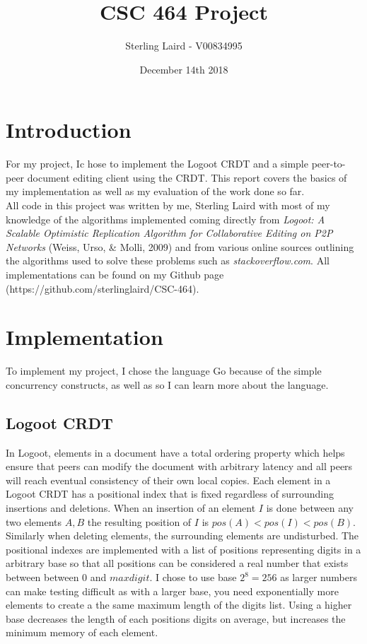 \documentclass[11pt]{article}
\title{CSC 464 Project}
\author{Sterling Laird - V00834995}
\date{December 14th 2018}
\begin{document}
\maketitle

\section{Introduction}
For my project, Ic hose  to implement the Logoot CRDT and a simple peer-to-peer document editing client using the CRDT. This report covers the basics of my implementation as well as my evaluation of the work done so far.\\

All code in this project was written by me, Sterling Laird with most of my knowledge of the algorithms implemented coming directly from \textit{Logoot: A Scalable Optimistic Replication Algorithm for Collaborative Editing on P2P Networks} (Weiss, Urso, \& Molli, 2009) and from various online sources outlining the algorithms used to solve these problems such as \textit{stackoverflow.com}. All implementations can be found on my Github page \\(https://github.com/sterlinglaird/CSC-464).

\pagebreak

\section{Implementation}
To implement my project, I chose  the language Go because of the simple concurrency constructs, as well as so I can learn more about the language.

\subsection{Logoot CRDT}
In Logoot, elements in a document have a total ordering property which helps ensure that peers can modify the document with arbitrary latency and all peers will reach eventual consistency of their own local copies. Each element in a Logoot CRDT has a positional index that is fixed regardless of surrounding insertions and deletions. When an insertion of an element $I$ is done between any two elements $A,B$ the resulting position of $I$ is $pos(A) < pos(I) < pos(B)$. Similarly when deleting elements, the surrounding elements are undisturbed. The positional indexes are implemented with a list of positions representing digits in a arbitrary base so that all positions can be considered a real number that exists between between $0$ and $maxdigit$. I chose to use base $2^8=256$ as larger numbers can make testing difficult as with a larger base, you need exponentially more elements to create a the same maximum length of the digits list. Using a higher base decreases the length of each positions digits on average, but increases the minimum memory of each element.\\
\end{document}
